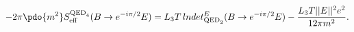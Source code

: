 \begin{equation}
\label{Eq_0613}
-2\pi \pdo{m^2} S^{\text{QED}_4}_{\text{eff}}
  (B \to e^{-i\pi/2} E)
  = L_3 T \, lndet^E_{\text{QED}_2} (B \to e^{-i\pi/2} E)
  - \frac{L_3 T ||E||^2 e^2}{12 \pi m^2}. 
\end{equation}

